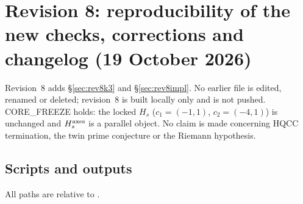 \section{Revision 8: reproducibility of the new checks, corrections and changelog (19 October 2026)}\label{app:rev8}
Revision~8 adds \S\ref{sec:rev8k3} and \S\ref{sec:rev8impl}. No earlier file is edited, renamed or deleted; revision~8 is built locally only and is not pushed. CORE\_FREEZE holds: the locked $H_s$ ($c_1=(-1,1)$, $c_2=(-4,1)$) is unchanged and $H_s^{\rm axes}$ is a parallel object. No claim is made concerning HQCC termination, the twin prime conjecture or the Riemann hypothesis.

\subsection{Scripts and outputs}\label{app:rev8scripts}
All paths are relative to .
